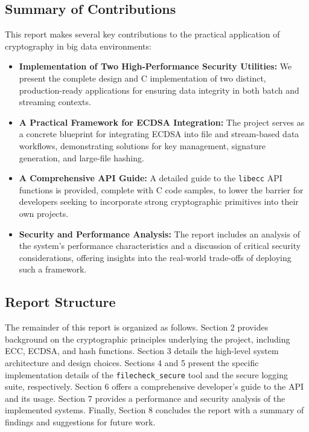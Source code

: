 \documentclass[12pt, letterpaper]{article}
\begin{document}
	\subsection{Summary of Contributions}
	This report makes several key contributions to the practical application of cryptography in big data environments:
	\begin{itemize}
		\item \textbf{Implementation of Two High-Performance Security Utilities:} We present the complete design and C implementation of two distinct, production-ready applications for ensuring data integrity in both batch and streaming contexts.
		\item \textbf{A Practical Framework for ECDSA Integration:} The project serves as a concrete blueprint for integrating ECDSA into file and stream-based data workflows, demonstrating solutions for key management, signature generation, and large-file hashing.
		\item \textbf{A Comprehensive API Guide:} A detailed guide to the \texttt{libecc} API functions is provided, complete with C code samples, to lower the barrier for developers seeking to incorporate strong cryptographic primitives into their own projects.
		\item \textbf{Security and Performance Analysis:} The report includes an analysis of the system's performance characteristics and a discussion of critical security considerations, offering insights into the real-world trade-offs of deploying such a framework.
	\end{itemize}
	
	\subsection{Report Structure}
	The remainder of this report is organized as follows. Section 2 provides background on the cryptographic principles underlying the project, including ECC, ECDSA, and hash functions. Section 3 details the high-level system architecture and design choices. Sections 4 and 5 present the specific implementation details of the \texttt{filecheck\_secure} tool and the secure logging suite, respectively. Section 6 offers a comprehensive developer's guide to the API and its usage. Section 7 provides a performance and security analysis of the implemented systems. Finally, Section 8 concludes the report with a summary of findings and suggestions for future work.
	
\end{document}
